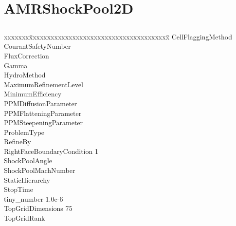 \documentclass{book}
\begin{document}
\section{AMRShockPool2D} \label{s:AMRShockPool2D}

\subsection{\enzo}

{\parametersize
\begin{tabbing}
xxxxxxx\=xxxxxxxxxxxxxxxxxxxxxxxxxxxxxxxxxxxxxxx\=\kill
\> CellFlaggingMethod             \\
\> CourantSafetyNumber     \\
\> FluxCorrection          \\
\> Gamma                   \\
\> HydroMethod                 \\
\> MaximumRefinementLevel         \\
\> MinimumEfficiency            \\
\> PPMDiffusionParameter          \\
\> PPMFlatteningParameter         \\
\> PPMSteepeningParameter         \\
\> ProblemType                        \\
\> RefineBy                       \\
\> RightFaceBoundaryCondition  1   \\
\> ShockPoolAngle               \\
\> ShockPoolMachNumber       \\
\> StaticHierarchy                \\
\> StopTime                \\
\> tiny\_number               \> 1.0e-6   \\
\> TopGridDimensions           75 \\
\> TopGridRank                
\end{tabbing}}

\end{document}
